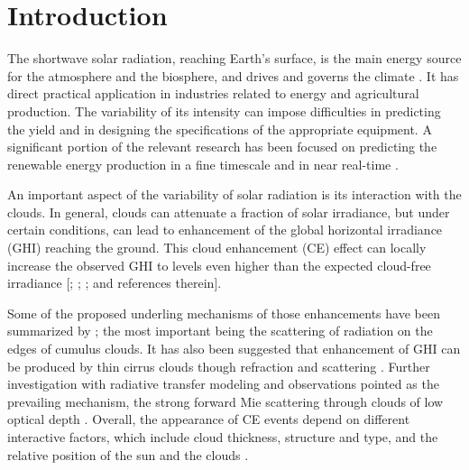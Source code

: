 \documentclass[preprint, 5p,
authoryear]{elsarticle} %
\begin{document}
\hypertarget{introduction}{%
\section{Introduction}\label{introduction}}

The shortwave solar radiation, reaching Earth's surface, is the main
energy source for the atmosphere and the biosphere, and drives and
governs the climate \citep{Gray2010}. It has direct practical
application in industries related to energy and agricultural production.
The variability of its intensity can impose difficulties in predicting
the yield and in designing the specifications of the appropriate
equipment. A significant portion of the relevant research has been
focused on predicting the renewable energy production in a fine
timescale and in near real-time \citep[for a review
see][]{Inman2013, Graabak2016}.

An important aspect of the variability of solar radiation is its
interaction with the clouds. In general, clouds can attenuate a fraction
of solar irradiance, but under certain conditions, can lead to
enhancement of the global horizontal irradiance (GHI) reaching the
ground. This cloud enhancement (CE) effect can locally increase the
observed GHI to levels even higher than the expected cloud-free
irradiance {[}\citet{Cordero2023}; \citet{Vamvakas2020};
\citet{CastillejoCuberos2020}; and references therein{]}.

Some of the proposed underling mechanisms of those enhancements have
been summarized by \citet{Gueymard2017}; the most important being the
scattering of radiation on the edges of cumulus clouds. It has also been
suggested that enhancement of GHI can be produced by thin cirrus clouds
though refraction and scattering \citep{Thuillier2013}. Further
investigation with radiative transfer modeling and observations pointed
as the prevailing mechanism, the strong forward Mie scattering through
clouds of low optical depth
\citep{Pecenak2016, Thuillier2013, Yordanov2013, Yordanov2015}. Overall,
the appearance of CE events depend on different interactive factors,
which include cloud thickness, structure and type, and the relative
position of the sun and the clouds \citep{Gueymard2017, Veerman2022}.
\end{document}
